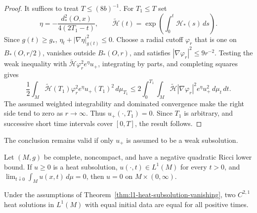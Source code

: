 \begin{proof}
\sketch
{}
It suffices to treat $T\leq(8b)^{-1}$.  For $T_1\leq T$ set
\[
\eta=-\frac{d_*^2(O,x)}{4(2T_1-t)},\qquad
\widetilde{\mathcal H}(t)=
\exp\!\left(\int_0^t\mathcal H_*(s)\,ds\right).
\]
Since $g(t)\geq g_*$,
$\eta_t+|\nabla\eta|_{g(t)}^2\leq0$.  Choose a radial cutoff $\varphi_r$ that
is one on $B_*(O,r/2)$, vanishes outside $B_*(O,r)$, and satisfies
$|\nabla\varphi_r|^2\leq9r^{-2}$.  Testing the weak inequality with
$\widetilde{\mathcal H}\varphi_r^2e^\eta u_+$, integrating by parts, and
completing squares gives
\[
\frac12\int_M\widetilde{\mathcal H}(T_1)\varphi_r^2e^\eta
u_+(T_1)^2\,d\mu_{T_1}
\leq2\int_0^{T_1}\!\int_M
\widetilde{\mathcal H}|\nabla\varphi_r|^2e^\eta u_+^2\,d\mu_t\,dt.
\]
The assumed weighted integrability and dominated convergence make the right
side tend to zero as $r\to\infty$.  Thus $u_+(\cdot,T_1)=0$.  Since $T_1$ is
arbitrary, and successive short time intervals cover $[0,T]$, the result
follows.
\end{proof}

\begin{remark}
\label{rem:evolving-wmp-positive-part}


The conclusion remains valid if only $u_+$ is assumed to be a weak
subsolution.
\end{remark}

\begin{theorem}[$L^1$ vanishing]
\label{thm:l1-heat-subsolution-vanishing}

Let $(M,g)$ be complete, noncompact, and have a negative quadratic Ricci lower
bound.  If $u\geq0$ is a heat subsolution,
$u(\cdot,t)\in L^1(M)$ for every $t>0$, and
$\lim_{t\downarrow0}\int_Mu(x,t)\,d\mu=0$, then $u=0$ on
$M\times(0,\infty)$.
\end{theorem}

\begin{corollary}[$L^1$ uniqueness]
\label{cor:l1-heat-uniqueness}


Under the assumptions of Theorem~\ref{thm:l1-heat-subsolution-vanishing}, two
$C^{2,1}$ heat solutions in $L^1(M)$ with equal initial data are equal for all
positive times.
\end{corollary}

